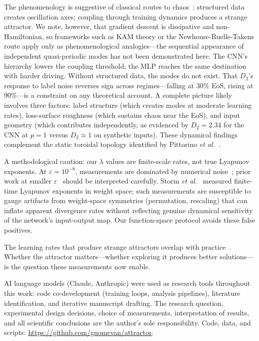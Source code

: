 \documentclass[aps,prl,twocolumn,superscriptaddress,floatfix]{revtex4-2}
\begin{document}
The phenomenology is suggestive of classical routes to chaos~\cite{ruelle1971,newhouse1978}: structured data creates oscillation axes; coupling through training dynamics produces a strange attractor. We note, however, that gradient descent is dissipative and non-Hamiltonian, so frameworks such as KAM theory or the Newhouse-Ruelle-Takens route apply only as phenomenological analogies---the sequential appearance of independent quasi-periodic modes has not been demonstrated here. The CNN's hierarchy lowers the coupling threshold; the MLP reaches the same destination with harder driving. Without structured data, the modes do not exist. That $D_2$'s response to label noise reverses sign across regimes---falling at 30\% EoS, rising at 90\%---is a constraint on any theoretical account. A complete picture likely involves three factors: label structure (which creates modes at moderate learning rates), loss-surface roughness (which sustains chaos near the EoS), and input geometry (which contributes independently, as evidenced by $D_2 = 2.34$ for the CNN at $p = 1$ versus $D_2 \approx 1$ on synthetic inputs). These dynamical findings complement the static toroidal topology identified by Pittorino \textit{et al.}~\cite{pittorino2022}.

A methodological caution: our $\lambda$ values are finite-scale rates, not true Lyapunov exponents. At $\varepsilon = 10^{-8}$, measurements are dominated by numerical noise~\cite{sm}; prior work at smaller $\varepsilon$~\cite{morales2024} should be interpreted carefully. Storm \textit{et al.}~\cite{storm2024} measured finite-time Lyapunov exponents in weight space; such measurements are susceptible to gauge artifacts from weight-space symmetries (permutation, rescaling) that can inflate apparent divergence rates without reflecting genuine dynamical sensitivity of the network's input-output map. Our function-space protocol avoids these false positives.

The learning rates that produce strange attractors overlap with practice~\cite{cohen2021}. Whether the attractor matters---whether exploring it produces better solutions---is the question these measurements now enable.

\begin{acknowledgments}
AI language models (Claude, Anthropic) were used as research tools throughout this work: code co-development (training loops, analysis pipelines), literature identification, and iterative manuscript drafting. The research question, experimental design decisions, choice of measurements, interpretation of results, and all scientific conclusions are the author's sole responsibility. Code, data, and scripts: \url{https://github.com/gnomevan/attractor}.
\end{acknowledgments}
\end{document}
